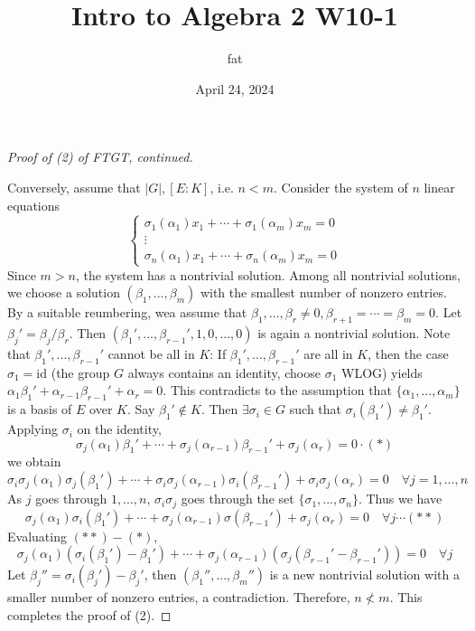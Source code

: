 \documentclass{article}
\title{Intro to Algebra 2 W10-1}
\author{fat}
\date{April 24, 2024}
\theoremstyle{definition}
\newenvironment{proofs}[1][\proofname]{%
  \begin{proof}[#1]$ $\par\nobreak\ignorespaces
}{%
  \end{proof}
}
\begin{document}
\maketitle
\thispagestyle{fancy}
\renewcommand{\footrulewidth}{0.4pt}
\cfoot{\thepage}
\renewcommand{\headrulewidth}{0.4pt}

\begin{proofs}[Proof of (2) of FTGT, continued]
	Conversely, assume that $|G| , [E:K]$, i.e. $n < m$.
	Consider the system of $n$ linear equations
	\[
		\left\{
			\begin{split}
				\sigma_1(\alpha_1) x_1 + \cdots + \sigma_1 (\alpha_m) x_m = 0\\
				\vdots \quad \quad \quad \quad \quad \quad \\
				\sigma_n(\alpha_1) x_1 + \cdots + \sigma_n (\alpha_m) x_m = 0
			\end{split}
			\right.
	\]
	Since $m > n$, the system has a nontrivial solution.
	Among all nontrivial solutions, we choose a solution $(\beta_1, ..., \beta_m)$ with the smallest number of nonzero entries.
	By a suitable reumbering, wea assume that $\beta_1, ..., \beta_r \neq 0, \beta_{r + 1} = \cdots = \beta_m = 0$.
	Let $\beta_j' = \beta_j/\beta_r$.
	Then $(\beta_1', ..., \beta_{r - 1}', 1, 0, ..., 0)$ is again a nontrivial solution.
	Note that $\beta_1', ..., \beta_{r - 1}'$ cannot be all in $K$: 
	If $\beta_1', ..., \beta_{r - 1}'$ are all in $K$, then the case $\sigma_1 = \text{id}$ (the group $G$ always contains an identity, choose $\sigma_1$ WLOG) yields $\alpha_1 \beta_1' + \alpha_{r - 1} \beta_{r - 1}' + \alpha_r = 0$.
	This contradicts to the assumption that $\{\alpha_1, ..., \alpha_m\}$ is a basis of $E$ over $K$.
	Say $\beta_1' \notin K$.
	Then $\exists \sigma_i \in G$ such that $\sigma_i (\beta_1') \neq \beta_1'$.
	Applying $\sigma_i$ on the identity, 
	\[
		\sigma_j (\alpha_1) \beta_1' + \cdots + \sigma_j (\alpha_{r - 1}) \beta_{r - 1}' + \sigma_j (\alpha_r) = 0 \cdot (*)
	\]
	we obtain
	\[
		\sigma_i \sigma_j (\alpha_1) \sigma_j(\beta_1') + \cdots + \sigma_i \sigma_j(\alpha_{r - 1}) \sigma_i (\beta_{r - 1}') + \sigma_i \sigma_j (\alpha_r) = 0 \quad \forall j = 1, ..., n 
	\]
	As $j$ goes through $1, ..., n$, $\sigma_i \sigma_j$ goes through the set $\{\sigma_1, ..., \sigma_n\}$.
	Thus we have
	\[
		\sigma_j(\alpha_1) \sigma_i (\beta_1') + \cdots + \sigma_j(\alpha_{r - 1})\sigma(\beta_{r - 1}') + \sigma_j(\alpha_r) = 0 \quad \forall j \cdots (**)
	\]
	Evaluating $(**) - (*)$, 
	\[
		\sigma_j(\alpha_1) (\sigma_i(\beta_1') - \beta_1') + \cdots + \sigma_j(\alpha_{r - 1})(\sigma_j (\beta_{r - 1}' - \beta_{r - 1}')) = 0 \quad \forall j
	\]
	Let $\beta_j'' = \sigma_i(\beta_j') - \beta_j'$, then $(\beta_1'', ..., \beta_m'')$ is a new nontrivial solution with a smaller number of nonzero entries, a contradiction.
	Therefore, $n \not< m$.
	This completes the proof of (2).
\end{proofs}
\end{document}
